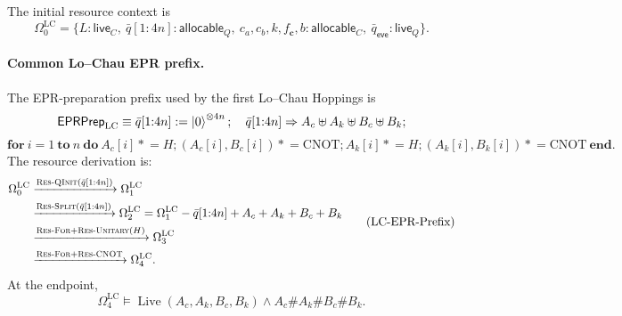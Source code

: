 \documentclass{report}
\theoremstyle{defn_style}
\newcommand{\asteq}{\mathrel{*}=}
\providecommand{\Live}{\operatorname{Live}}
\begin{document}
The initial resource context is
\[
\Omega^{\mathrm{LC}}_0
=
\{
  L:\mathsf{live}_C,\ 
  \bar q[1{:}4n]:\mathsf{allocable}_Q,\ 
  c_a,c_b,k,f_{\mathbf c},b:\mathsf{allocable}_C,\ 
  \bar q_{\mathsf{eve}}:\mathsf{live}_Q
\}.
\]

\paragraph{Common Lo--Chau EPR prefix.}
The EPR-preparation prefix used by the first Lo--Chau Hoppings is
\[
\mathsf{EPRPrep}_{\mathrm{LC}}
\equiv
\bar q[1{:}4n]:=\ket0^{\otimes 4n};
\quad
\bar q[1{:}4n]\Rightarrow A_c\uplus A_k\uplus B_c\uplus B_k;
\]
\[
\mathbf{for}\ i=1\ \mathbf{to}\ n\ \mathbf{do}\ 
  A_c[i]\asteq H;
  (A_c[i],B_c[i])\asteq\mathrm{CNOT};
  A_k[i]\asteq H;
  (A_k[i],B_k[i])\asteq\mathrm{CNOT}
\ \mathbf{end}.
\]
The resource derivation is:
\[
\begin{aligned}
\Omega^{\mathrm{LC}}_0
&\xrightarrow{\textsc{Res-QInit}(\bar q[1{:}4n])}
\Omega^{\mathrm{LC}}_1
\\
&\xrightarrow{\textsc{Res-Split}(\bar q[1{:}4n])}
\Omega^{\mathrm{LC}}_2
=
\Omega^{\mathrm{LC}}_1-\bar q[1{:}4n]+A_c+A_k+B_c+B_k
\\
&\xrightarrow{\textsc{Res-For}+\textsc{Res-Unitary}(H)}
\Omega^{\mathrm{LC}}_3
\\
&\xrightarrow{\textsc{Res-For}+\textsc{Res-CNOT}}
\Omega^{\mathrm{LC}}_4 .
\end{aligned}
\tag{LC-EPR-Prefix}
\]
At the endpoint,
\[
\Omega^{\mathrm{LC}}_4
\models
\Live(A_c,A_k,B_c,B_k)
\land
A_c\#A_k\#B_c\#B_k.
\tag{LC-EPR}\label{LC-EPR}
\]
\end{document}
